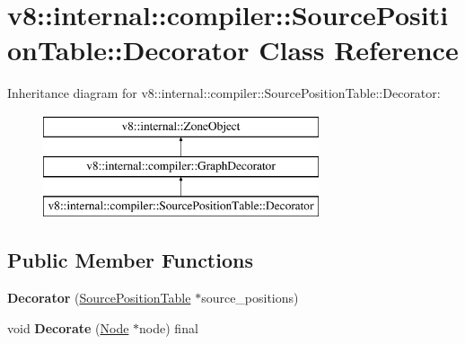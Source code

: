 \hypertarget{classv8_1_1internal_1_1compiler_1_1_source_position_table_1_1_decorator}{}\section{v8\+:\+:internal\+:\+:compiler\+:\+:Source\+Position\+Table\+:\+:Decorator Class Reference}
\label{classv8_1_1internal_1_1compiler_1_1_source_position_table_1_1_decorator}
Inheritance diagram for v8\+:\+:internal\+:\+:compiler\+:\+:Source\+Position\+Table\+:\+:Decorator\+:\begin{figure}[H]
\begin{center}
\leavevmode
\includegraphics[height=3.000000cm]{classv8_1_1internal_1_1compiler_1_1_source_position_table_1_1_decorator}
\end{center}
\end{figure}
\subsection*{Public Member Functions}
\begin{DoxyCompactItemize}
\item 
{\bfseries Decorator} (\hyperlink{classv8_1_1internal_1_1compiler_1_1_source_position_table}{Source\+Position\+Table} $\ast$source\+\_\+positions)\hypertarget{classv8_1_1internal_1_1compiler_1_1_source_position_table_1_1_decorator_a2c293d7dc3a966e3d179b1c385b81957}{}\label{classv8_1_1internal_1_1compiler_1_1_source_position_table_1_1_decorator_a2c293d7dc3a966e3d179b1c385b81957}

\item 
void {\bfseries Decorate} (\hyperlink{classv8_1_1internal_1_1compiler_1_1_node}{Node} $\ast$node) final\hypertarget{classv8_1_1internal_1_1compiler_1_1_source_position_table_1_1_decorator_a179328e1909ec3a068a86748ac3b5d58}{}\label{classv8_1_1internal_1_1compiler_1_1_source_position_table_1_1_decorator_a179328e1909ec3a068a86748ac3b5d58}

\end{DoxyCompactItemize}
